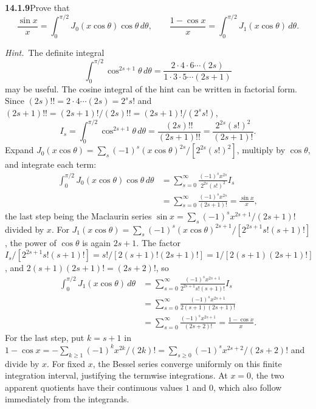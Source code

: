 \par\bigskip
\noindent\textbf{14.1.9}\quad Prove that
\[
\frac{\sin x}{x}=\int_{0}^{\pi/2}J_{0}(x\cos\theta)\cos\theta\,d\theta,
\qquad
\frac{1-\cos x}{x}=\int_{0}^{\pi/2}J_{1}(x\cos\theta)\,d\theta.
\]
\par\emph{Hint.}~The definite integral
\[
\int_{0}^{\pi/2}\cos^{2s+1}\theta\,d\theta=
\frac{2\cdot4\cdot6\cdots(2s)}{1\cdot3\cdot5\cdots(2s+1)}
\]
may be useful.
\solution
The cosine integral of the hint can be written in factorial form.
Since $(2s)!!=2\cdot4\cdots(2s)=2^ss!$ and
$(2s+1)!!=(2s+1)!/(2s)!!=(2s+1)!/(2^ss!)$,
\[
I_s=\int_0^{\pi/2}\cos^{2s+1}\theta\,d\theta
=\frac{(2s)!!}{(2s+1)!!}
=\frac{2^{2s}(s!)^2}{(2s+1)!}.
\]
Expand $J_0(x\cos\theta)=\sum_s(-1)^s(x\cos\theta)^{2s}/[2^{2s}(s!)^2]$,
multiply by $\cos\theta$, and integrate each term:
\begin{align*}
\int_0^{\pi/2}J_0(x\cos\theta)\cos\theta\,d\theta
&=\sum_{s=0}^{\infty}\frac{(-1)^sx^{2s}}{2^{2s}(s!)^2}I_s\\
&=\sum_{s=0}^{\infty}\frac{(-1)^sx^{2s}}{(2s+1)!}
=\boxed{\frac{\sin x}{x}},
\end{align*}
the last step being the Maclaurin series
$\sin x=\sum_s(-1)^sx^{2s+1}/(2s+1)!$ divided by $x$.
For $J_1(x\cos\theta)=\sum_s(-1)^s(x\cos\theta)^{2s+1}/[2^{2s+1}s!(s+1)!]$,
the power of $\cos\theta$ is again $2s+1$. The factor
$I_s/[2^{2s+1}s!(s+1)!]=s!/[2(s+1)!(2s+1)!]=1/[2(s+1)(2s+1)!]$, and
$2(s+1)(2s+1)!=(2s+2)!$, so
\begin{align*}
\int_0^{\pi/2}J_1(x\cos\theta)\,d\theta
&=\sum_{s=0}^{\infty}\frac{(-1)^sx^{2s+1}}{2^{2s+1}s!(s+1)!}I_s\\
&=\sum_{s=0}^{\infty}\frac{(-1)^sx^{2s+1}}{2(s+1)(2s+1)!}\\
&=\sum_{s=0}^{\infty}\frac{(-1)^sx^{2s+1}}{(2s+2)!}
=\boxed{\frac{1-\cos x}{x}}.
\end{align*}
For the last step, put $k=s+1$ in
$1-\cos x=-\sum_{k\ge1}(-1)^kx^{2k}/(2k)!
=\sum_{s\ge0}(-1)^sx^{2s+2}/(2s+2)!$ and divide by $x$.
For fixed $x$, the Bessel series converge uniformly on this finite
integration interval, justifying the termwise integrations.
At $x=0$, the two apparent quotients have their continuous values
$1$ and $0$, which also follow immediately from the integrands.

